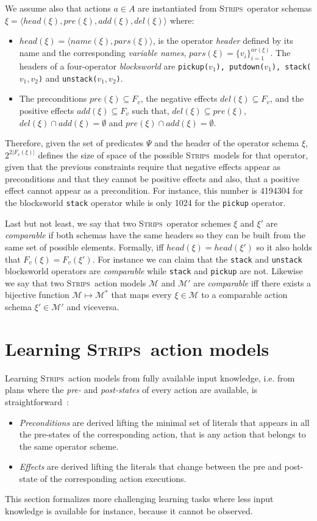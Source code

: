 \documentclass[3p,times]{elsarticle}
\newcommand{\strips}{\textsc{Strips}}     %
\newcommand{\tup}[1]{{\langle #1 \rangle}}
\begin{document}
We assume also that actions $a\in A$ are instantiated from \strips\ operator schemas $\xi=\tup{head(\xi),pre(\xi),add(\xi),del(\xi)}$ where:
\begin{itemize}
\item $head(\xi)=\tup{name(\xi),pars(\xi)}$, is the operator {\em header} defined by its name and the corresponding {\em variable names}, $pars(\xi)=\{v_i\}_{i=1}^{ar(\xi)}$. The headers of a four-operator {\em blocksworld} are {\small\tt pickup($v_1$), putdown($v_1$), stack($v_1,v_2$)} and {\small\tt unstack($v_1,v_2$)}.
\item The preconditions $pre(\xi)\subseteq F_v$, the negative effects $del(\xi)\subseteq F_v$, and the positive effects $add(\xi)\subseteq F_v$ such that, $del(\xi)\subseteq pre(\xi)$, $del(\xi)\cap add(\xi)=\emptyset$ and $pre(\xi)\cap add(\xi)=\emptyset$.
\end{itemize}
Therefore, given the set of predicates $\Psi$ and the header of the operator schema $\xi$, $2^{2|F_v(\xi)|}$ defines the size of space of the possible \strips\ models for that operator, given that the previous constraints require that negative effects appear as preconditions and that they cannot be positive effects and also, that a positive effect cannot appear as a precondition. For instance, this number is 4194304 for the blocksworld {\tt stack} operator while is only 1024 for the {\tt pickup} operator.

Last but not least, we say that two \strips\ operator schemes $\xi$ and $\xi'$ are {\em comparable} if both schemas have the same headers so they can be built from the same set of possible elements. Formally, iff $head(\xi)=head(\xi')$ so it also holds that $F_v(\xi)=F_v(\xi')$. For instance we can claim that the {\tt stack} and {\tt unstack} blocksworld operators are {\em comparable} while  {\tt stack} and {\tt pickup} are not. Likewise we say that two \strips\ action models $\mathcal{M}$ and $\mathcal{M}'$ are {\em comparable} iff there exists a bijective function $\mathcal{M} \mapsto \mathcal{M}^*$ that maps every $\xi\in\mathcal{M}$ to a comparable action schema $\xi'\in\mathcal{M'}$ and viceversa.



\section{Learning \strips\ action models}
\label{sec:Section4}
Learning \strips\ action models from fully available input knowledge, i.e. from plans where the {\em pre-} and {\em post-states} of every action are available, is straightforward~\cite{jimenez2012review}:
\begin{itemize}
  \item {\em Preconditions} are derived lifting the minimal set of literals that appears in all the pre-states of the corresponding action, that is any action that belongs to the same operator scheme. 
  \item {\em Effects} are derived lifting the literals that change between the pre and post-state of the corresponding action executions.
\end{itemize}
This section formalizes more challenging learning tasks where less input knowledge is available for instance, because it cannot be observed.
\end{document}
